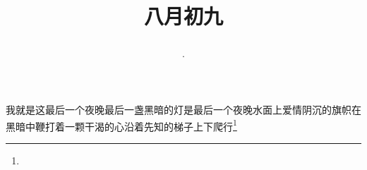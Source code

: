\title{\date[d=11,m=9,y=2024][year:cn-y,年,month:cn,day:cn,日,·,weekday]·八月初九 }
我就是这最后一个夜晚最后一盏黑暗的灯是最后一个夜晚水面上爱情阴沉的旗帜在黑暗中鞭打着一颗干渴的心沿着先知的梯子上下爬行\footnote{ }


